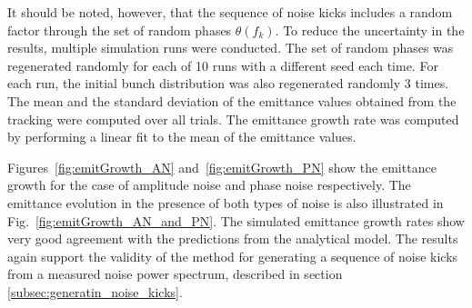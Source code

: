 It should be noted, however, that the sequence of noise kicks includes a random factor through the set of random phases $\theta(f_k)$. To reduce the uncertainty in the results, multiple simulation runs were conducted. The set of random phases was regenerated randomly for each of 10 runs with a different seed each time. For each run, the initial bunch distribution was also regenerated randomly 3 times. The mean and the standard deviation of the emittance values obtained from the tracking were computed over all trials. The emittance growth rate was computed by performing a linear fit to the mean of the emittance values.

Figures~\ref{fig:emitGrowth_AN} and~\ref{fig:emitGrowth_PN} show the emittance growth for the case of amplitude noise and phase noise respectively. The emittance evolution in the presence of both types of noise is also illustrated in Fig.~\ref{fig:emitGrowth_AN_and_PN}. The simulated emittance growth rates show very good agreement with the predictions from the analytical model. The results again support the validity of the method for generating a sequence of noise kicks from a measured noise power spectrum, described in section \ref{subsec:generatin_noise_kicks}.


